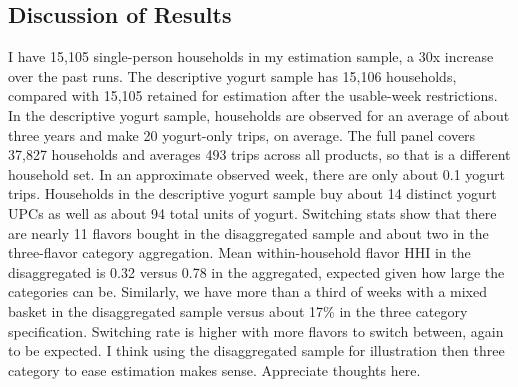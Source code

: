 \documentclass[11pt]{article}
\begin{document}
% 
% 
\clearpage

\subsection{Discussion of Results}

I have 15,105 single-person households in my estimation sample, a 30x increase over the past runs. The descriptive yogurt sample has 15,106 households, compared with 15,105 retained for estimation after the usable-week restrictions. In the descriptive yogurt sample, households are observed for an average of about three years and make 20 yogurt-only trips, on average. The full panel covers 37,827 households and averages 493 trips across all products, so that is a different household set. In an approximate observed week, there are only about 0.1 yogurt trips. Households in the descriptive yogurt sample buy about 14 distinct yogurt UPCs as well as about 94 total units of yogurt. Switching stats show that there are nearly 11 flavors bought in the disaggregated sample and about two in the three-flavor category aggregation. Mean within-household flavor HHI in the disaggregated is 0.32 versus 0.78 in the aggregated, expected given how large the categories can be. Similarly, we have more than a third of weeks with a mixed basket in the disaggregated sample versus about 17\% in the three category specification. Switching rate is higher with more flavors to switch between, again to be expected. I think using the disaggregated sample for illustration then three category to ease estimation makes sense. Appreciate thoughts here.
\end{document}
